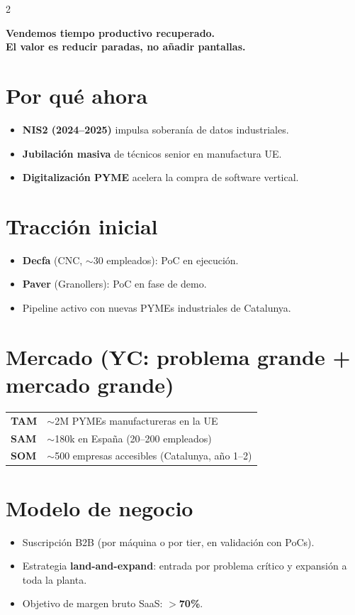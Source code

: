 \documentclass[10pt,a4paper]{article}
\begin{document}
\begin{multicols}{2}
\begin{center}
\colorbox{softgreen}{\parbox{0.94\linewidth}{\centering\small\bfseries
Vendemos tiempo productivo recuperado.\\
El valor es reducir paradas, no a\~nadir pantallas.
}}
\end{center}

\section{Por qu\'e ahora}
\begin{itemize}[leftmargin=1em,itemsep=1pt,topsep=2pt]
\item \textbf{NIS2 (2024--2025)} impulsa soberan\'ia de datos industriales.
\item \textbf{Jubilaci\'on masiva} de t\'ecnicos senior en manufactura UE.
\item \textbf{Digitalizaci\'on PYME} acelera la compra de software vertical.
\end{itemize}

\section{Tracci\'on inicial}
\begin{itemize}[leftmargin=1em,itemsep=1pt,topsep=2pt]
\item \textbf{Decfa} (CNC, $\sim$30 empleados): PoC en ejecuci\'on.
\item \textbf{Paver} (Granollers): PoC en fase de demo.
\item Pipeline activo con nuevas PYMEs industriales de Catalunya.
\end{itemize}

\columnbreak

\section{Mercado (YC: problema grande + mercado grande)}
\small
\renewcommand{\arraystretch}{1.15}
\begin{tabularx}{0.96\linewidth}{lX}
\toprule
\textbf{TAM} & $\sim$2M PYMEs manufactureras en la UE \\
\textbf{SAM} & $\sim$180k en Espa\~na (20--200 empleados) \\
\textbf{SOM} & $\sim$500 empresas accesibles (Catalunya, a\~no 1--2) \\
\bottomrule
\end{tabularx}
\normalsize

\section{Modelo de negocio}
\begin{itemize}[leftmargin=1em,itemsep=1pt,topsep=2pt]
\item Suscripci\'on B2B (por m\'aquina o por tier, en validaci\'on con PoCs).
\item Estrategia \textbf{land-and-expand}: entrada por problema cr\'itico y expansi\'on a toda la planta.
\item Objetivo de margen bruto SaaS: \textbf{$>$70\%}.
\end{itemize}


\end{multicols}
\end{document}
